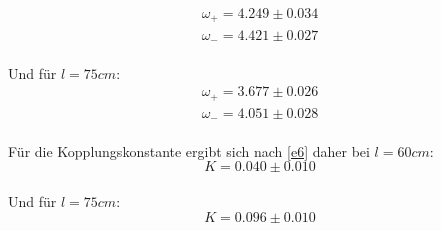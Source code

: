 \begin{equation*}
\begin{split}
  \omega_+ = 4.249 \pm 0.034 \\
  \omega_- = 4.421 \pm 0.027
\end{split}
\end{equation*}
\\
Und für $l = 75cm$:
\begin{equation*}
\begin{split}
  \omega_+ = 3.677 \pm 0.026 \\
  \omega_- = 4.051 \pm 0.028
\end{split}
\end{equation*}
\\
Für die Kopplungskonstante ergibt sich nach \eqref{e6} daher bei $l = 60cm$:
\begin{equation*}
  K = 0.040 \pm 0.010
\end{equation*}
\\
Und für $l = 75cm$:
\begin{equation*}
  K = 0.096 \pm 0.010
\end{equation*}
\\
